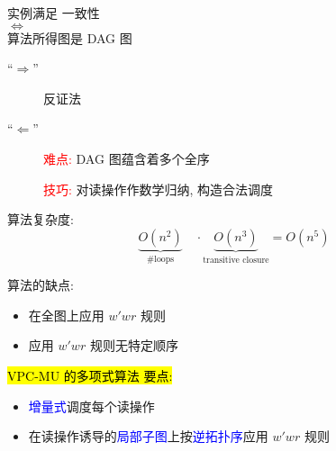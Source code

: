 \begin{frame}{}
  \begin{ctheorem}
    \begin{center}
       实例满足 \PRAM{} 一致性 \\[5pt]
      $\iff$ \\[5pt]
      \rwclosure{} 算法所得图是 DAG 图
    \end{center}
  \end{ctheorem}

  \pause
  \vspace{0.20cm}

  \begin{cproof}
    \begin{description}
      \item[``$\Longrightarrow$''] 反证法
      \item[``$\Longleftarrow$''] 
	\textcolor{red}{难点:} DAG 图蕴含着多个全序

	\textcolor{red}{技巧:} 对读操作作数学归纳, 构造合法调度
    \end{description}
  \end{cproof}

  \pause
  \vspace{0.30cm}

  \rwclosure{} 算法复杂度: 
  \[
    \underbrace{O(n^2)}_{\textrm{\#loops}} \quad\cdot
	\underbrace{O(n^3)}_{\textrm{transitive closure}}  = O(n^5)
  \]
\end{frame}

\begin{frame}{}
  \rwclosure{} 算法的缺点:
  \begin{itemize}
	\item 在全图上应用 $w'wr$ 规则
	\item 应用 $w'wr$ 规则无特定顺序
  \end{itemize}

  \pause
  \vspace{0.80cm}

  \hl{VPC-MU 的多项式算法 \readcentric{} 要点:}
  \begin{itemize}
	\item \textcolor{blue}{增量式}调度每个读操作
	\item 在读操作诱导的\textcolor{blue}{局部子图}上按\textcolor{blue}{逆拓扑序}应用 $w'wr$ 规则
  \end{itemize}
\end{frame}

